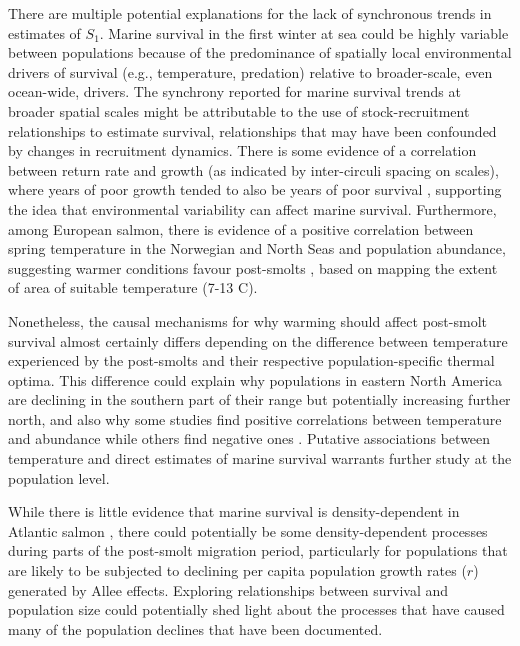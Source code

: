 \documentclass[12pt]{article}
\newcommand{\So}{$S_{1}$\xspace}
\begin{document}
There are multiple potential explanations for the lack of synchronous
trends in estimates of \So. 
Marine survival in the first winter at sea could be highly variable between
populations because of the predominance of spatially local environmental drivers of survival (e.g., temperature, predation) 
relative to broader-scale, even ocean-wide, drivers.
The synchrony reported for marine survival trends at broader spatial scales \citep{Olmos2019}
might be attributable to the use of stock-recruitment relationships to estimate survival,
relationships that may have been confounded by changes in recruitment dynamics.
There is some evidence of a correlation between return rate and growth (as
indicated by inter-circuli spacing on scales), where years of poor growth
tended to also be years of poor survival \citep{Friedland1993}, supporting the
idea that environmental variability can affect marine survival.
Furthermore, among European salmon, there is evidence of a positive correlation
between spring temperature in the Norwegian and North Seas and population abundance, suggesting warmer
conditions favour post-smolts \citep{Friedland1998}, based on mapping the
extent of area of suitable temperature (7-13 \textdegree C).

Nonetheless, the causal mechanisms for why warming should affect post-smolt
survival almost certainly differs depending on the difference between
temperature experienced by the post-smolts and their respective
population-specific thermal optima. 
This difference could explain why populations in eastern North America are
declining in the southern part of their range but potentially increasing
further north, and also why some studies find positive correlations between
temperature and abundance \citep{Friedland1998, Friedland1998b, Jonsson2004}
while others find negative ones \citep{Friedland1993, Todd2008}.
Putative associations between temperature and direct estimates of marine
survival warrants further study at the population level.

While there is little evidence that marine survival is density-dependent in
Atlantic salmon \citep{Jonsson1998,Gibson2006}, there could potentially be
some density-dependent processes during parts of the post-smolt migration
period, particularly for populations that are likely to be subjected to
declining per capita population growth rates ($r$) generated by Allee effects.
Exploring relationships between survival and population size could potentially
shed light about the processes that have caused many of the population
declines that have been documented.
\end{document}

